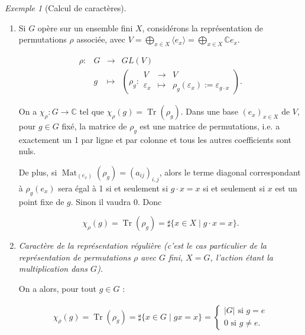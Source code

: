 \documentclass[french]{book}
\theoremstyle{definition}
\theoremstyle{remark}
\newtheorem*{protoexemple}{Exemple}
\newenvironment{exemple}
    {\colorlet{shadecolor}{gray!10}\begin{shaded}\begin{protoexemple}}
    {\end{protoexemple}\end{shaded}}
\begin{document}
\begin{exemple}[Calcul de caractères]

  \

  \begin{enumerate}
    \item Si \(G\) opère sur un ensemble fini \(X\), considérons la représentation de permutations \(\rho\) associée, avec \(V = \bigoplus _{x \in X} \langle e_x \rangle = \bigoplus _{x \in X} \mathbb{C} e_x\).

    \[\begin{matrix}
    \rho : & G & \longrightarrow & GL(V) \\
    \ & g & \longmapsto &\left( \rho_g : \begin{matrix}
    V & \longrightarrow & V \\
    \varepsilon_x & \longmapsto & \rho_g(\varepsilon_x) := \varepsilon _{g \cdot x}
    \end{matrix} \right).
    \end{matrix}\]

    On a \(\chi _{\rho} : G \longrightarrow \mathbb{C}\) tel que \(\chi _{\rho}(g) = \operatorname{Tr}(\rho_g)\). Dans une base \((e_x) _{x \in X}\) de \(V\), pour \(g \in G\) fixé, la matrice de \(\rho_g\) est une matrice de permutations, i.e. a exactement un 1 par ligne et par colonne et tous les autres coefficients sont nuls.

    De plus, si \(\operatorname{Mat} _{(e_x)} (\rho_g) = (a _{ij}) _{i,j}\), alors le terme diagonal correspondant à \(\rho_g(e_x)\) sera égal à 1 si et seulement si \(g \cdot x = x\) si et seulement si \(x\) est un point fixe de \(g\). Sinon il vaudra 0. Donc

    \[\chi _{\rho}(g) = \operatorname{Tr}(\rho_g) = \sharp \{ x \in X \mid g \cdot x = x \}.\]

    \item \emph{Caractère de la représentation régulière (c'est le cas particulier de la représentation de permutations \(\rho\) avec \(G\) fini, \(X = G\), l'action étant la multiplication dans \(G\)).}

    On a alors, pour tout \(g \in G\) :

    \begin{gather}
      \chi _{\rho}(g) = \operatorname{Tr}(\rho_g) = \sharp \{ x \in G \mid g x=x \} = \begin{cases}
        \lvert G \rvert \text{ si } g=e \\
        0 \text{ si } g \neq e.
      \end{cases}
    \end{gather}
  \end{enumerate}
\end{exemple}
\end{document}
